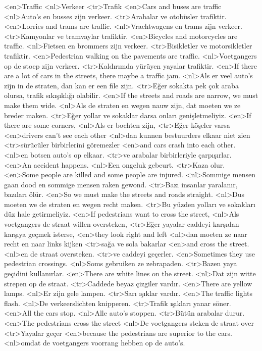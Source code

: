 <en>Traffic
<nl>Verkeer
<tr>Trafik
<en>Cars and buses are traffic
<nl>Auto's en busses zijn verkeer.
<tr>Arabalar ve otobüsler trafiktir.
<en>Lorries and trams are traffic.
<nl>Vrachtwagens en trams zijn verkeer.
<tr>Kamyonlar ve tramvaylar trafiktir.
<en>Bicycles and motorcycles are  traffic.
<nl>Fietsen en brommers zijn verkeer.
<tr>Bisikletler ve motorsikletler trafiktir.
<en>Pedestrian walking on the pavements are traffic.
<nl>Voetgangers op de stoep zijn verkeer.
<tr>Kaldırımda yürüyen yayalar trafiktir.
<en>If there are a lot of cars in the streets, there maybe a  traffic jam.
<nl>Als er veel auto's zijn in de straten, dan kan er een file zijn.
<tr>Eğer sokakta pek çok araba olursa, trafik sıkışıklığı olabilir.
<en>If the streets and roads are narrow, we must make them wide.
<nl>Als de straten en wegen nauw zijn, dat moeten we ze breder maken.
<tr>Eğer yollar ve sokaklar darsa onları genişletmeliyiz.
<en>If there are some corners,
<nl>Als er bochten zijn,
<tr>Eğer köşeler varsa
<en>drivers can’t see each other
<nl>dan kunnen bestuurders elkaar niet zien
<tr>sürücüler birbirlerini göremezler
<en>and cars crash into each other.
<nl>en botsen auto's op elkaar.
<tr>ve arabalar birbirleriyle çarpışırlar.
<en>An accident happens.
<nl>Een ongeluk gebeurt.
<tr>Kaza olur.
<en>Some people are killed and some people are injured.
<nl>Sommige mensen gaan dood en sommige mensen raken gewond.
<tr>Bazı insanlar yaralanır, bazıları ölür.
<en>So we must make the streets and roads straight.
<nl>Dus moeten we de straten en wegen recht maken.
<tr>Bu yüzden yolları ve sokakları düz hale getirmeliyiz.
<en>If  pedestrians want to cross the street,
<nl>Als voetgangers de straat willen oversteken,
<tr>Eğer yayalar caddeyi karşıdan karşıya geçmek isterse,
<en>they look right and left
<nl>dan moeten ze naar recht en naar links kijken
<tr>sağa ve sola bakarlar
<en>and cross the street.
<nl>en de straat oversteken.
<tr>ve caddeyi geçerler.
<en>Sometimes they use pedestrian crossings.
<nl>Soms gebruiken ze zebrapaden.
<tr>Bazen yaya geçidini kullanırlar.
<en>There are white lines on the street.
<nl>Dat zijn witte strepen op de straat.
<tr>Caddede beyaz çizgiler vardır.
<en>There are yellow lamps.
<nl>Er zijn gele lampen.
<tr>Sarı ışıklar vardır.
<en>The traffic lights flash.
<nl>De verkeerslichten knipperen. 
<tr>Trafik ışıkları yanar söner.
<en>All the cars stop.
<nl>Alle auto's stoppen.
<tr>Bütün arabalar durur.
<en>The pedestrians cross the street
<nl>De voetgangers steken de straat over
<tr>Yayalar geçer
<en>because the pedestrians are superior to the cars. 
<nl>omdat de voetgangers voorrang hebben op de auto's. 

